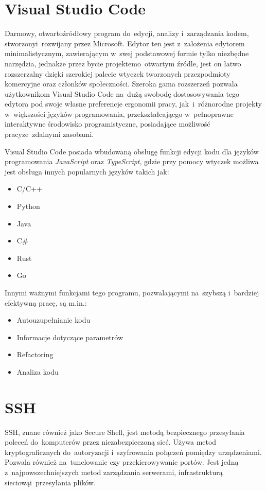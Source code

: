 \section{Visual Studio Code}
Darmowy, otwartoźródłowy program do~edycji, analizy i~zarządzania kodem, stworzony\linebreak i~rozwijany przez Microsoft. Edytor ten jest z~założenia edytorem minimalistycznym, zawierającym w~swej podstawowej formie tylko niezbędne narzędzia, jednakże przez bycie projektem\linebreak o~otwartym źródle, jest on łatwo rozszerzalny dzięki szerokiej palecie wtyczek tworzonych przez\linebreak podmioty komercyjne oraz członków społeczności. Szeroka gama rozszerzeń pozwala użytkownikom Visual Studio Code na~dużą swobodę dostosowywania tego edytora pod swoje własne preferencje ergonomii pracy, jak~i~różnorodne projekty w~większości języków programowania, przekształcając\linebreak go w~pełnoprawne interaktywne środowisko programistyczne, posiadające możliwość pracy\linebreak ze~zdalnymi zasobami.

Visual Studio Code posiada wbudowaną obsługę funkcji edycji kodu dla języków programowania \textit{JavaScript} oraz \textit{TypeScript}, gdzie przy pomocy wtyczek możliwa jest obsługa innych popularnych języków takich jak:

\begin{itemize}
	\item C/C++
	\item Python
	\item Java
	\item C\#
	\item Rust
	\item Go
\end{itemize}

Innymi ważnymi funkcjami tego programu, pozwalającymi na~szybszą i~bardziej efektywną pracę, są m.in.:

\begin{itemize}
	\item Autouzupełnianie kodu
	\item Informacje dotyczące parametrów 
	\item Refactoring
	\item Analiza kodu
\end{itemize}

\section{SSH}
SSH, znane również jako Secure Shell, jest metodą bezpiecznego przesyłania poleceń do~komputerów przez niezabezpieczoną sieć. Używa metod kryptograficznych do~autoryzacji i~szyfrowania połączeń pomiędzy urządzeniami. Pozwala również na~tunelowanie czy przekierowywanie portów. Jest jedną z~najpowszechniejszych metod zarządzania serwerami, infrastrukturą sieciową\linebreak i~przesyłania plików.